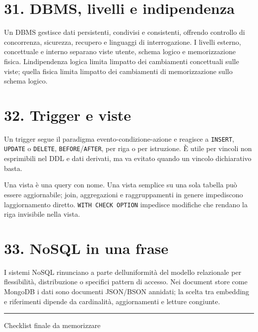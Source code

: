 \documentclass[
  10pt,
  a4paper,
]{article}
\begin{document}
\section{31. DBMS, livelli e
indipendenza}\label{31-dbms-livelli-e-indipendenza}

Un DBMS gestisce dati persistenti, condivisi e consistenti, offrendo
controllo di concorrenza, sicurezza, recupero e linguaggi di
interrogazione. I livelli esterno, concettuale e interno separano viste
utente, schema logico e memorizzazione fisica.
L\textquotesingle indipendenza logica limita l\textquotesingle impatto
dei cambiamenti concettuali sulle viste; quella fisica limita
l\textquotesingle impatto dei cambiamenti di memorizzazione sullo schema
logico.

\section{32. Trigger e viste}\label{32-trigger-e-viste}

Un trigger segue il paradigma evento-condizione-azione e reagisce a
\texttt{INSERT}, \texttt{UPDATE} o \texttt{DELETE},
\texttt{BEFORE}/\texttt{AFTER}, per riga o per istruzione. È utile per
vincoli non esprimibili nel DDL e dati derivati, ma va evitato quando un
vincolo dichiarativo basta.

Una vista è una query con nome. Una vista semplice su una sola tabella
può essere aggiornabile; join, aggregazioni e raggruppamenti in genere
impediscono l\textquotesingle aggiornamento diretto.
\texttt{WITH\ CHECK\ OPTION} impedisce modifiche che rendano la riga
invisibile nella vista.

\section{33. NoSQL in una frase}\label{33-nosql-in-una-frase}

I sistemi NoSQL rinunciano a parte dell\textquotesingle uniformità del
modello relazionale per flessibilità, distribuzione o specifici pattern
di accesso. Nei document store come MongoDB i dati sono documenti
JSON/BSON annidati; la scelta tra embedding e riferimenti dipende da
cardinalità, aggiornamenti e letture congiunte.

\begin{center}\rule{0.5\linewidth}{0.5pt}\end{center}

Checklist finale da memorizzare
\end{document}
